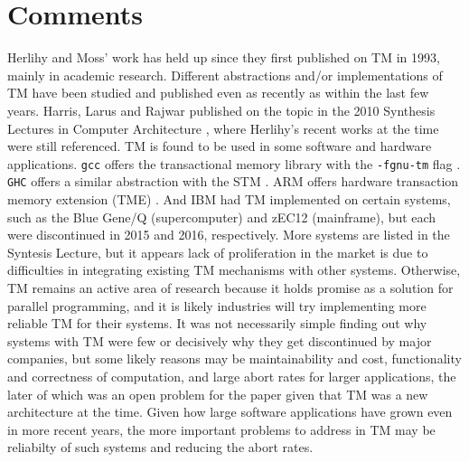 \documentclass [12pt]{article}
\begin{document}
    \section{Comments} %
    \label{sec:comments}
        Herlihy and Moss' work has held up since they first published on TM in 1993, mainly in academic research. Different abstractions and/or implementations of TM have been studied and published even as recently as within the last few years. Harris, Larus and Rajwar published on the topic in the 2010 Synthesis Lectures in Computer Architecture \cite{harris}, where Herlihy's recent works at the time were still referenced. TM is found to be used in some software and hardware applications. \lstinline!gcc! offers the transactional memory library with the \lstinline!-fgnu-tm! flag \cite{gnutm}. \lstinline|GHC| offers a similar abstraction with the STM \cite{haskell}. ARM offers hardware transaction memory extension (TME) \cite{arm}. And IBM had TM implemented on certain systems, such as the Blue Gene/Q (supercomputer) and zEC12 (mainframe), but each were discontinued in 2015 and 2016, respectively. More systems are listed in the Syntesis Lecture, but it appears lack of proliferation in the market is due to difficulties in integrating existing TM mechanisms with other systems. Otherwise, TM remains an active area of research because it holds promise as a solution for parallel programming, and it is likely industries will try implementing more reliable TM for their systems. It was not necessarily simple finding out why systems with TM were few or decisively why they get discontinued by major companies, but some likely reasons may be maintainability and cost, functionality and correctness of computation, and large abort rates for larger applications, the later of which was an open problem for the paper given that TM was a new architecture at the time. Given how large software applications have grown even in more recent years, the more important problems to address in TM may be reliabilty of such systems and reducing the abort rates.

 
        
\end{document}
